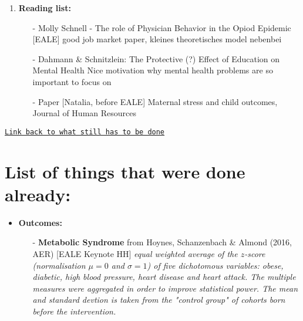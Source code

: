 \documentclass[11pt,a4paper]{article}
\begin{document}
{\begin{enumerate}
\item \textbf{Reading list:}
\begin{itemize}
	\item[-] Molly Schnell - The role of Physician Behavior in the Opiod Epidemic [EALE]\newline
	good job market paper, kleines theoretisches model nebenbei
	\item[-]  Dahmann \& Schnitzlein: The Protective (?) Effect of Education on Mental Health   \newline
 	Nice motivation why mental health problems are so important to focus on 
 	\item[-] Paper [Natalia, before EALE] Maternal stress and child outcomes, Journal of Human Resources
\end{itemize}
\end{enumerate}




\newpage
\hfill{\hyperlink{TODO}{\Large{\texttt{Link back to what still has to be done}}}
\bigskip

\label{DONE}
\section{List of things that were done already: }
\begin{itemize}
\item \textbf{Outcomes: }\vspace{-1em}
	\begin{itemize}
	\item[-]\textbf{Metabolic Syndrome}  from Hoynes, Schanzenbach \& Almond (2016, AER) [EALE Keynote HH]\newline
	\textit{
	equal weighted average of the $z$-score (normalisation $\mu=0$ and $\sigma=1$) of five dichotomous variables: obese, diabetic, high blood pressure, heart disease and heart attack. The multiple measures were aggregated in order to improve statistical power. The mean and standard devtion is taken from the "control group" of cohorts born before the intervention.}
	\end{itemize}


\end{itemize}}}
\end{document}
